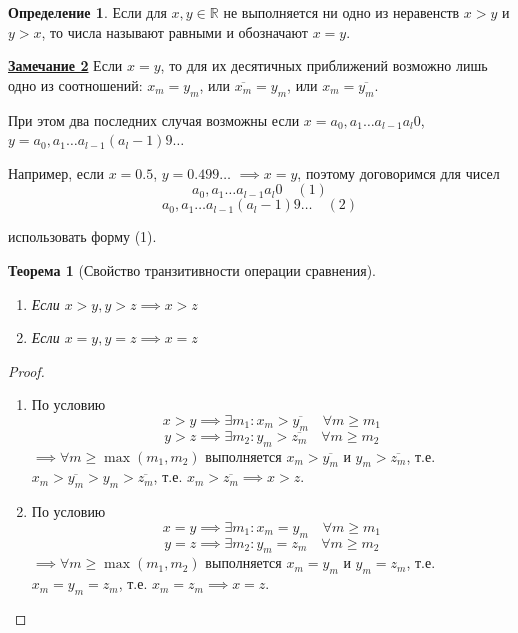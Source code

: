 \documentclass[a4paper,oneside]{article}
\newcommand{\parspace}{\vspace{10pt}}
\newtheorem{theorem}{Теорема}[subsection]
\theoremstyle{definition}
\newtheorem{definition}{Определение}[subsection]
\theoremstyle{definition}
\theoremstyle{definition}
\begin{document}
\begin{definition}
    Если для $x, y \in \mathbb{R}$ не выполняется ни одно из неравенств $x > y$ и $y > x$,
    то числа называют равными и обозначают $x = y$.
\end{definition}

\underline{\textbf{Замечание 2}}
Если $x = y$, то для их десятичных приближений возможно лишь одно из соотношений:
$x_m = y_m$, или $\overline{x_m} = y_m$, или $x_m = \overline{y_m}$.

При этом два последних случая возможны если $x = a_0,a_1 \dots a_{l-1}a_l0$,
$y = a_0,a_1 \dots a_{l-1}(a_l-1)9 \dots$ 

Например, если $x = 0.5$, $y = 0.499 \dots$ $\implies x = y$,
поэтому договоримся для чисел
\[a_0,a_1 \dots a_{l-1}a_l0 \quad (1)\]
\[a_0,a_1 \dots a_{l-1}(a_l-1)9 \dots \quad (2)\]

использовать форму (1).

\parspace

\begin{theorem}[Свойство транзитивности операции сравнения]
    \begin{enumerate}[label=\alph*)]
        \item Если $x > y, y > z \implies x > z$
        \item Если $x = y, y = z \implies x = z$
    \end{enumerate}
\end{theorem}

\begin{proof}
    \begin{enumerate}[label=\alph*)]
        \item
            По условию
            \[x > y \implies \exists m_1: x_m > \overline{y_m} \quad \forall m \ge m_1\]
            \[y > z \implies \exists m_2: y_m > \overline{z_m} \quad \forall m \ge m_2\]
            $\implies \forall m \ge \max (m_1, m_2)$ выполняется $x_m > \overline{y_m}$
            и $y_m > \overline{z_m}$, т.е. $x_m > \overline{y_m} > y_m > \overline{z_m}$,
            т.е. $x_m > \overline{z_m} \implies x > z$.
        
        \item
            По условию
            \[x = y \implies \exists m_1: x_m = y_m \quad \forall m \ge m_1\]
            \[y = z \implies \exists m_2: y_m = z_m \quad \forall m \ge m_2\]
            $\implies \forall m \ge \max (m_1, m_2)$ выполняется $x_m = y_m$
            и $y_m = z_m$, т.е. $x_m = y_m = z_m$,
            т.е. $x_m = z_m \implies x = z$.
    \end{enumerate}
\end{proof}
\end{document}
